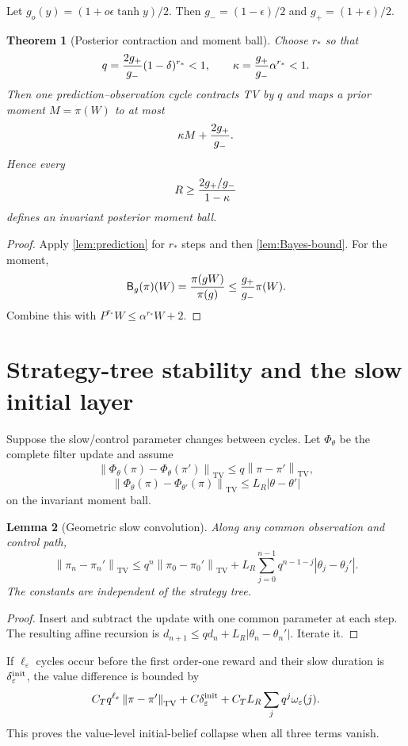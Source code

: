 \documentclass[11pt,reqno]{amsart}
\newtheorem{theorem}{Theorem}[section]
\newtheorem{lemma}[theorem]{Lemma}
\theoremstyle{definition}
\newcommand{\TV}{\mathrm{TV}}
\newcommand{\norm}[1]{\left\lVert#1\right\rVert}
\newcommand{\abs}[1]{\left\lvert#1\right\rvert}
\begin{document}
Let $g_o(y)=(1+o\epsilon\tanh y)/2$.  Then
$g_-=(1-\epsilon)/2$ and $g_+=(1+\epsilon)/2$.

\begin{theorem}[Posterior contraction and moment ball]\label{thm:posterior}
Choose $r_*$ so that
\[
 q={2g_+\over g_-}(1-\delta)^{r_*}<1,
 \qquad
 \kappa={g_+\over g_-}\alpha^{r_*}<1.
\]
Then one prediction--observation cycle contracts TV by $q$ and maps a prior
moment $M=\pi(W)$ to at most
\[
 \kappa M+{2g_+\over g_-}.
\]
Hence every
\[
 R\ge {2g_+/g_-\over1-\kappa}
\]
defines an invariant posterior moment ball.
\end{theorem}

\begin{proof}
Apply \cref{lem:prediction} for $r_*$ steps and then
\cref{lem:Bayes-bound}.  For the moment,
\[
 \mathsf B_g(\pi)(W)
 ={\pi(gW)\over\pi(g)}
 \le{g_+\over g_-}\pi(W).
\]
Combine this with $P^{r_*}W\le\alpha^{r_*}W+2$.
\end{proof}

\section{Strategy-tree stability and the slow initial layer}

Suppose the slow/control parameter changes between cycles.  Let
$\Phi_\theta$ be the complete filter update and assume
\[
 \norm{\Phi_\theta(\pi)-\Phi_\theta(\pi')}_{\TV}
 \le q\norm{\pi-\pi'}_{\TV},
\]
\[
 \norm{\Phi_\theta(\pi)-\Phi_{\theta'}(\pi)}_{\TV}
 \le L_R\abs{\theta-\theta'}
\]
on the invariant moment ball.

\begin{lemma}[Geometric slow convolution]\label{lem:convolution}
Along any common observation and control path,
\[
 \norm{\pi_n-\pi_n'}_{\TV}
 \le q^n\norm{\pi_0-\pi_0'}_{\TV}
 +L_R\sum_{j=0}^{n-1}q^{n-1-j}
 \abs{\theta_j-\theta_j'}.
\]
The constants are independent of the strategy tree.
\end{lemma}

\begin{proof}
Insert and subtract the update with one common parameter at each step.  The
resulting affine recursion is
$d_{n+1}\le qd_n+L_R\abs{\theta_n-\theta_n'}$.  Iterate it.
\end{proof}

If $\ell_\varepsilon$ cycles occur before the first order-one reward and their
slow duration is $\delta_\varepsilon^{\rm init}$, the value difference is
bounded by
\[
 C_Tq^{\ell_\varepsilon}\norm{\pi-\pi'}_{\TV}
 +C\delta_\varepsilon^{\rm init}
 +C_TL_R\sum_jq^j\omega_\varepsilon(j).
\]
This proves the value-level initial-belief collapse when all three terms vanish.
\end{document}
